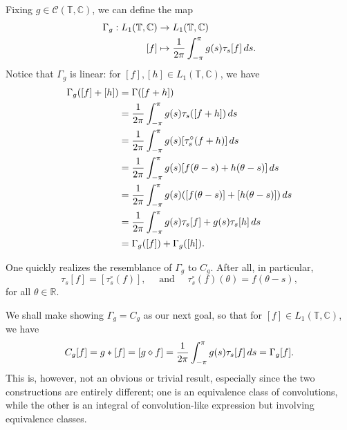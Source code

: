 \documentclass[notoc,notitlepage]{tufte-book}
\begin{document}
Fixing $g \in \mathcal{C}(\mathbb{T}, \mathbb{C})$,
we can define the map
\begin{align*}
  \Gamma_g : L_1(\mathbb{T}, \mathbb{C}) &\to L_1(\mathbb{T}, \mathbb{C}) \\
      [f] &\mapsto \frac{1}{2\pi} \int_{-\pi}^{\pi} g(s)\tau_s[f] \mathop{}\!d{s}.
\end{align*}
Notice that $\Gamma_g$ is linear: for $[f], [h] \in L_1(\mathbb{T}, \mathbb{C})$,
we have
\begin{align*}
  \Gamma_g([f] + [h])
  &= \Gamma([f + h]) \\
  &= \frac{1}{2\pi} \int_{-\pi}^{\pi} g(s) \tau_s([f + h]) \mathop{}\!d{s} \\
  &= \frac{1}{2\pi} \int_{-\pi}^{\pi} g(s)[\tau_s^{\circ}(f + h)] \mathop{}\!d{s} \\
  &= \frac{1}{2\pi} \int_{-\pi}^{\pi} g(s)[f(\theta - s) + h(\theta - s)] \mathop{}\!d{s} \\
  &= \frac{1}{2\pi} \int_{-\pi}^{\pi} g(s)
    ([f(\theta - s)] + [h(\theta - s)]) \mathop{}\!d{s} \\
  &= \frac{1}{2\pi} \int_{-\pi}^{\pi} g(s)\tau_s[f] + g(s)\tau_s[h] \mathop{}\!d{s} \\
  &= \Gamma_g([f]) + \Gamma_g([h]).
\end{align*}

One quickly realizes the resemblance of $\Gamma_g$ to
\hyperref[defn:convolution_operator_with_kernel]{$C_g$}.
After all, in particular,
\begin{equation*}
  \tau_s[f] = [\tau_s^\circ(f)], \quad \text{ and } \quad
  \tau_s^\circ(f)(\theta) = f(\theta - s),
\end{equation*}
for all $\theta \in \mathbb{R}$.

We shall make showing $\Gamma_g = C_g$ as our next goal, so that
for $[f] \in L_1(\mathbb{T}, \mathbb{C})$, we have
\begin{equation*}
  C_g[f] = g * [f] = [g \diamond f]
  = \frac{1}{2\pi} \int_{-\pi}^{\pi} g(s) \tau_s[f] \mathop{}\!d{s} = \Gamma_g[f].
\end{equation*}
This is, however, not an obvious or trivial result,
especially since the two constructions are entirely different;
one is an equivalence class of convolutions,
while the other is an integral of convolution-like expression
but involving equivalence classes.


\end{document}
